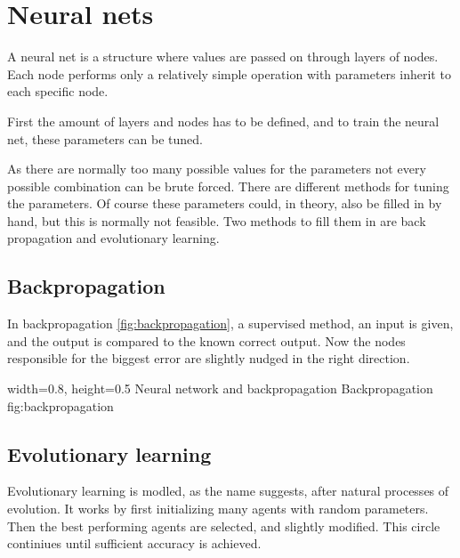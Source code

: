 \section{Neural nets} 
\label{sec:NN}
\cite[p727]{MA}
A neural net is a structure where values are passed on through layers of nodes. Each node performs only a relatively simple operation with parameters inherit to each specific node.

First the amount of layers and nodes has to be defined, and to train the neural net, these parameters can be tuned.

As there are normally too many possible values for the parameters not every possible combination can be brute forced. There are different methods for tuning the parameters. Of course these parameters could, in theory, also be filled in by hand, but this is normally not feasible. Two methods to fill them in are back propagation and evolutionary learning.

\subsection{Backpropagation}
In backpropagation \ref{fig:backpropagation}, a supervised method, an input is given, and the output is compared to the known correct output. Now the nodes responsible for the biggest error are slightly nudged in the right direction. 

    {width=0.8\textwidth, height=0.5\textheight} %
    {Neural network and backpropagation}   %
    {Backpropagation}   %
    {fig:backpropagation}    %
    
\subsection{Evolutionary learning}
Evolutionary learning is modled, as the name suggests, after natural processes of evolution. It works by first initializing many agents with random parameters. Then the best performing agents are selected, and slightly modified. This circle continiues until sufficient accuracy is achieved.